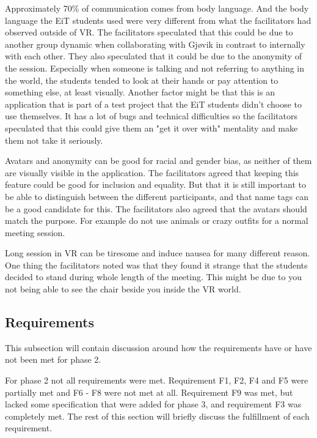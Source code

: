         Approximately 70\% of communication comes from body language. And the body language the EiT students used were very different from what the facilitators had observed outside of VR. The facilitators speculated that this could be due to another group dynamic when collaborating with Gjøvik in contrast to internally with each other. They also speculated that it could be due to the anonymity of the session. Especially when someone is talking and not referring to anything in the world, the students tended to look at their hands or pay attention to something else, at least visually. Another factor might be that this is an application that is part of a test project that the EiT students didn't choose to use themselves. It has a lot of bugs and technical difficulties so the facilitators speculated that this could give them an "get it over with" mentality and make them not take it seriously.
        
        Avatars and anonymity can be good for racial and gender bias, as neither of them are visually visible in the application. The facilitators agreed that keeping this feature could be good for inclusion and equality. But that it is still important to be able to distinguish between the different participants, and that name tags can be a good candidate for this. The facilitators also agreed that the avatars should match the purpose. For example do not use animals or crazy outfits for a normal meeting session.
        
        Long session in VR can be tiresome and induce nausea for many different reason. One thing the facilitators noted was that they found it strange that the students decided to stand during whole length of the meeting. This might be due to you not being able to see the chair beside you inside the VR world.
        
        \subsection{Requirements} %
        This subsection will contain discussion around how the requirements have or have not been met for phase 2.
        
        For phase 2 not all requirements were met. Requirement F1, F2, F4 and F5 were partially met and F6 - F8 were not met at all. Requirement F9 was met, but lacked some specification that were added for phase 3, and requirement F3 was completely met. The rest of this section will briefly discuss the fulfillment of each requirement.
        

